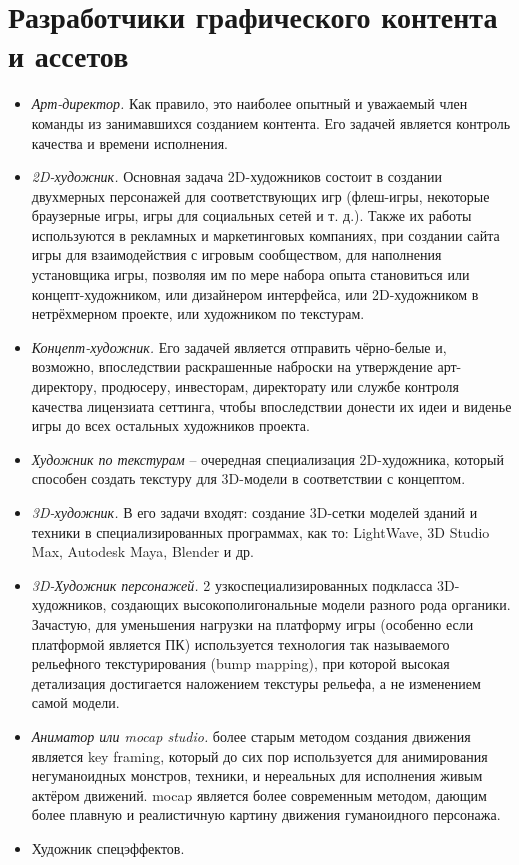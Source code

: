 \section{Разработчики графического контента и ассетов}
\begin{itemize}
    \item \emph{Арт-директор.} Как правило, это наиболее опытный и уважаемый член команды из занимавшихся
        созданием контента. Его задачей является контроль качества и времени исполнения.
    \item \emph{2D-художник.} Основная задача 2D-художников состоит в создании двухмерных персонажей для
        соответствующих игр (флеш-игры, некоторые браузерные игры, игры для социальных сетей и т. д.). Также
        их работы используются в рекламных и маркетинговых компаниях, при создании сайта игры для
        взаимодействия с игровым сообществом, для наполнения установщика игры, позволяя им по мере набора
        опыта становиться или концепт-художником, или дизайнером интерфейса, или 2D-художником в
        нетрёхмерном проекте, или художником по текстурам.
    \item \emph{Концепт-художник.} Его задачей является отправить чёрно-белые и, возможно, впоследствии
        раскрашенные наброски на утверждение арт-директору, продюсеру, инвесторам, директорату или службе
        контроля качества лицензиата сеттинга, чтобы впоследствии донести их идеи и виденье игры до всех
        остальных художников проекта.
    \item \emph{Художник по текстурам} -- очередная специализация 2D-художника, который способен создать
        текстуру для 3D-модели в соответствии с концептом.
    \item \emph{3D-художник.} В его задачи входят: создание 3D-сетки моделей зданий и техники в
        специализированных программах, как то: LightWave, 3D Studio Max, Autodesk Maya, Blender и др.
    \item \emph{3D-Художник персонажей.} 2 узкоспециализированных подкласса 3D-художников, создающих
        высокополигональные модели разного рода органики. Зачастую, для уменьшения нагрузки на платформу
        игры (особенно если платформой является ПК) используется технология так называемого рельефного
        текстурирования (bump mapping), при которой высокая детализация достигается наложением текстуры
        рельефа, а не изменением самой модели.
    \item \emph{Аниматор или mocap studio.} более старым методом создания движения является key framing,
        который до сих пор используется для анимирования негуманоидных монстров, техники, и нереальных для
        исполнения живым актёром движений. mocap является более современным методом, дающим более плавную и
        реалистичную картину движения гуманоидного персонажа.
    \item Художник спецэффектов.
\end{itemize}

